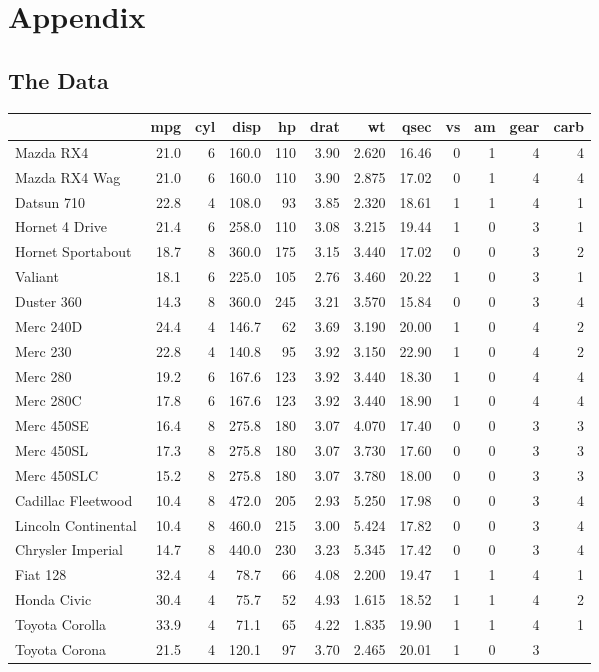 \documentclass[
11pt,%
a4paper,%
]%
{article}%
\begin{document}
\hypertarget{appendix}{%
\section{Appendix}\label{appendix}}

\hypertarget{the-data}{%
\subsection{The Data}\label{the-data}}

\begin{longtable}[]{@{}lrrrrrrrrrrr@{}}
\toprule
& mpg & cyl & disp & hp & drat & wt & qsec & vs & am & gear &
carb\tabularnewline
\midrule
\endhead
Mazda RX4 & 21.0 & 6 & 160.0 & 110 & 3.90 & 2.620 & 16.46 & 0 & 1 & 4 &
4\tabularnewline
Mazda RX4 Wag & 21.0 & 6 & 160.0 & 110 & 3.90 & 2.875 & 17.02 & 0 & 1 &
4 & 4\tabularnewline
Datsun 710 & 22.8 & 4 & 108.0 & 93 & 3.85 & 2.320 & 18.61 & 1 & 1 & 4 &
1\tabularnewline
Hornet 4 Drive & 21.4 & 6 & 258.0 & 110 & 3.08 & 3.215 & 19.44 & 1 & 0 &
3 & 1\tabularnewline
Hornet Sportabout & 18.7 & 8 & 360.0 & 175 & 3.15 & 3.440 & 17.02 & 0 &
0 & 3 & 2\tabularnewline
Valiant & 18.1 & 6 & 225.0 & 105 & 2.76 & 3.460 & 20.22 & 1 & 0 & 3 &
1\tabularnewline
Duster 360 & 14.3 & 8 & 360.0 & 245 & 3.21 & 3.570 & 15.84 & 0 & 0 & 3 &
4\tabularnewline
Merc 240D & 24.4 & 4 & 146.7 & 62 & 3.69 & 3.190 & 20.00 & 1 & 0 & 4 &
2\tabularnewline
Merc 230 & 22.8 & 4 & 140.8 & 95 & 3.92 & 3.150 & 22.90 & 1 & 0 & 4 &
2\tabularnewline
Merc 280 & 19.2 & 6 & 167.6 & 123 & 3.92 & 3.440 & 18.30 & 1 & 0 & 4 &
4\tabularnewline
Merc 280C & 17.8 & 6 & 167.6 & 123 & 3.92 & 3.440 & 18.90 & 1 & 0 & 4 &
4\tabularnewline
Merc 450SE & 16.4 & 8 & 275.8 & 180 & 3.07 & 4.070 & 17.40 & 0 & 0 & 3 &
3\tabularnewline
Merc 450SL & 17.3 & 8 & 275.8 & 180 & 3.07 & 3.730 & 17.60 & 0 & 0 & 3 &
3\tabularnewline
Merc 450SLC & 15.2 & 8 & 275.8 & 180 & 3.07 & 3.780 & 18.00 & 0 & 0 & 3
& 3\tabularnewline
Cadillac Fleetwood & 10.4 & 8 & 472.0 & 205 & 2.93 & 5.250 & 17.98 & 0 &
0 & 3 & 4\tabularnewline
Lincoln Continental & 10.4 & 8 & 460.0 & 215 & 3.00 & 5.424 & 17.82 & 0
& 0 & 3 & 4\tabularnewline
Chrysler Imperial & 14.7 & 8 & 440.0 & 230 & 3.23 & 5.345 & 17.42 & 0 &
0 & 3 & 4\tabularnewline
Fiat 128 & 32.4 & 4 & 78.7 & 66 & 4.08 & 2.200 & 19.47 & 1 & 1 & 4 &
1\tabularnewline
Honda Civic & 30.4 & 4 & 75.7 & 52 & 4.93 & 1.615 & 18.52 & 1 & 1 & 4 &
2\tabularnewline
Toyota Corolla & 33.9 & 4 & 71.1 & 65 & 4.22 & 1.835 & 19.90 & 1 & 1 & 4
& 1\tabularnewline
Toyota Corona & 21.5 & 4 & 120.1 & 97 & 3.70 & 2.465 & 20.01 & 1 & 0 & 3

\end{longtable}
\end{document}
